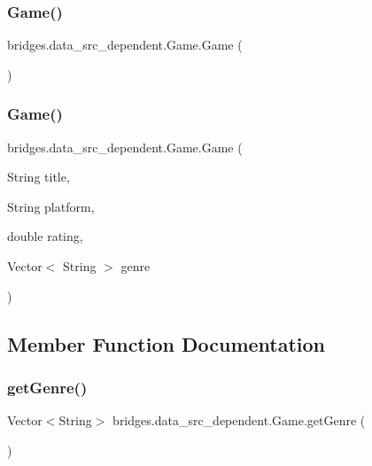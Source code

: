 \subsubsection{\texorpdfstring{Game()}{Game()}\hspace{0.1cm}{\footnotesize\ttfamily [1/2]}}
{\footnotesize\ttfamily bridges.\+data\+\_\+src\+\_\+dependent.\+Game.\+Game (\begin{DoxyParamCaption}{ }\end{DoxyParamCaption})}

\mbox{\label{classbridges_1_1data__src__dependent_1_1_game_a2bb9d9f659184be2cc9fc68e38433492}} 
\subsubsection{\texorpdfstring{Game()}{Game()}\hspace{0.1cm}{\footnotesize\ttfamily [2/2]}}
{\footnotesize\ttfamily bridges.\+data\+\_\+src\+\_\+dependent.\+Game.\+Game (\begin{DoxyParamCaption}\item[{String}]{title,  }\item[{String}]{platform,  }\item[{double}]{rating,  }\item[{Vector$<$ String $>$}]{genre }\end{DoxyParamCaption})}



\subsection{Member Function Documentation}
\mbox{\label{classbridges_1_1data__src__dependent_1_1_game_ab3c0e46513e71b56a2970ac014b1bf79}} 
\subsubsection{\texorpdfstring{getGenre()}{getGenre()}}
{\footnotesize\ttfamily Vector$<$String$>$ bridges.\+data\+\_\+src\+\_\+dependent.\+Game.\+get\+Genre (\begin{DoxyParamCaption}{ }\end{DoxyParamCaption})}

